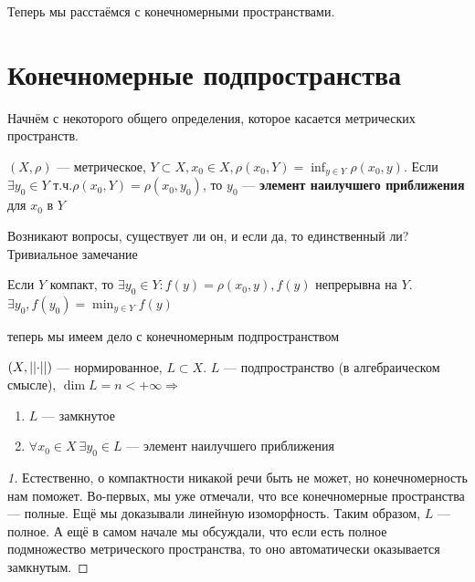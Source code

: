 \documentclass[document]{subfiles}
\begin{document}
Теперь мы расстаёмся с конечномерными пространствами.

\section{Конечномерные подпространства}

Начнём с некоторого общего определения, которое касается метрических пространств.
 
\begin{definition}
    $(X,\rho)$ --- метрическое, $Y \subset X, x_0 \in X, \rho(x_0,Y) = \inf_{y \in Y} \rho(x_0, y)$. Если $\exists y_0 \in Y$ т.ч.$ \rho(x_0, Y) = \rho(x_0,y_0)$, то
    $y_0$ --- \textbf{элемент наилучшего приближения} для $x_0$ в $Y$
\end{definition}

Возникают вопросы, существует ли он, и если да, то единственный ли? Тривиальное замечание
\begin{remark}
    Если $Y$ компакт, то $\exists y_0 \in Y : f(y) = \rho(x_0, y), f(y)$ непрерывна на $Y$. $\exists y_0, f(y_0) = \min_{y \in Y} f(y)$
\end{remark}


теперь мы имеем дело с конечномерным подпространством

\begin{theorem}
    $(X, \left|\left| {\cdot} \right| \right|)$ --- нормированное, $L \subset X$. $L$ --- подпространство (в алгебраическом смысле), $\dim L = n < + \infty \Rightarrow$
    \begin{enumerate}
        \item $L$ --- замкнутое \\
        \item $\forall x_0 \in X \: \exists y_0 \in L$ --- элемент наилучшего приближения
    \end{enumerate}
\end{theorem}

\begin{proof}[1]
    Естественно, о компактности никакой речи быть не может, но конечномерность нам поможет. Во-первых, мы уже отмечали, что все конечномерные пространства --- полные. Ещё мы доказывали линейную изоморфность.
Таким образом, $L$ --- полное. А ещё в самом начале мы обсуждали, что если есть полное подмножество метрического пространства, то оно автоматически оказывается замкнутым.
\end{proof}
\end{document}
